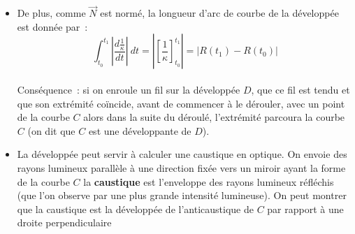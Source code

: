 \documentclass[a4paper,11pt]{article}
\begin{document}
\begin{itemize}
\verb|N:=perpendiculaire(M,T)|\\
\verb|trace(N)|\\
passer en mode pointeur (menu mode du niveau
de g\'eom\'etrie) et faire bouger le point $M$ le long
d'un quart de l'ellipse, ceci trace un faisceau de normales
\`a l'ellipse, dont on voit apparaitre l'enveloppe (limite
entre la r\'egion couverte et non couverte par des points
du faisceau de normales), cette enveloppe est
la d\'evelopp\'ee de l'ellipse (vous pouvez utiliser 
le menu M \`a droite
du dessin pour effacer les traces). Avec Xcas version 1.1.1-18
ou ult\'erieure on peut tracer la d\'evelopp\'ee avec
la commande \verb|developpee(G)|.\\ 
Cf. aussi les animations de l'article D\'evelopp\'ee de wikipedia.\\
{\bf Exercice}~: calculer le rep\`ere de Frenet pour une ellipse $E$,
par exemple $x(t)=4\cos(t), y(t)=3\sin(t)$
puis le rayon de courbure, puis la d\'evelopp\'ee $A$
(on obtient une courbe image par affinit\'e
d'une astro\"ide). Donner une \'equation
param\'etrique simple de $A$.\\
V\'erification avec Xcas (version \`a jour)~:\\
\verb|E:=plotparam([4cos(t),3sin(t)],t,0,2pi); A:=developpee(E);|\\
\verb|eq:=simplify(parameq(A)); trigcos(re(eq)); im(eq)|
\item
De plus, comme $\overrightarrow{N}$ est norm\'e,
la longueur d'arc de courbe de la d\'evelopp\'ee est donn\'ee par~:
$$ \int_{t_0}^{t_1} \left|\frac{d\frac{1}{\kappa}}{dt}\right| \ dt = 
\left| \left[\frac{1}{\kappa}\right]_{t_0}^{t_1} \right|
= |R(t_1)-R(t_0)|
$$
\\
Cons\'equence~: si on enroule un fil sur la d\'evelopp\'ee $D$,
que ce fil est tendu et que son extr\'emit\'e co\"incide, avant de
commencer \`a le d\'erouler, avec un point de la courbe $C$ 
alors dans la suite du d\'eroul\'e, l’extr\'emit\'e parcoura la courbe
$C$ (on dit que $C$ est une d\'eveloppante de $D$).
\item La d\'evelopp\'ee peut servir \`a calculer une caustique en
optique. On envoie des rayons lumineux parall\`ele \`a une
direction fix\'ee vers un miroir ayant la forme de la courbe $C$
la {\bf caustique} 
est l'enveloppe des rayons lumineux r\'efl\'echis
(que l'on observe par une plus grande intensit\'e lumineuse).
On peut montrer que la caustique est la d\'evelopp\'ee 
de l'anticaustique de $C$ par rapport \`a une droite perpendiculaire

\end{itemize}
\end{document}
